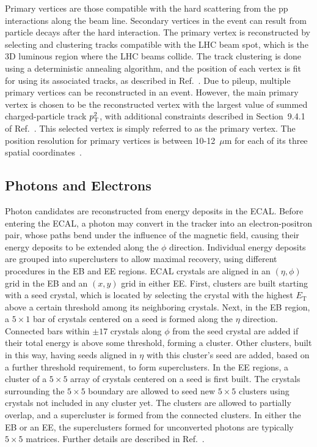 Primary vertices are those compatible with the hard scattering from the pp interactions along the beam line. Secondary vertices in the event can result from particle decays after the hard interaction. The primary vertex is reconstructed by selecting and clustering tracks compatible with the LHC beam spot, which is the 3D luminous region where the LHC beams collide. The track clustering is done using a deterministic annealing algorithm, and the position of each vertex is fit for using its associated tracks, as described in Ref.~\cite{Chatrchyan:2014fea}. Due to pileup, multiple primary vertices can be reconstructed in an event. However, the main primary vertex is chosen to be the reconstructed vertex with the largest value of summed charged-particle track $p_{\mathrm{T}}^2$, with additional constraints described in Section~9.4.1 of Ref.~\cite{Contardo:2020886}. This selected vertex is simply referred to as the primary vertex. The position resolution for primary vertices is between 10-12~$\mu$m for each of its three spatial coordinates~\cite{Chatrchyan:2014fea}.


\subsection{Photons and Electrons}

Photon candidates are reconstructed from energy deposits in the ECAL. Before entering the ECAL, a photon may convert in the tracker into an electron-positron pair, whose paths bend under the influence of the magnetic field, causing their energy deposits to be extended along the $\phi$ direction. Individual energy deposits are grouped into superclusters to allow maximal recovery, using different procedures in the EB and EE regions. ECAL crystals are aligned in an $(\eta, \phi)$ grid in the EB and an $(x, y)$ grid in either EE. First, clusters are built starting with a seed crystal, which is located by selecting the crystal with the highest $E_{\mathrm{T}}$ above a certain threshold among its neighboring crystals. Next, in the EB region, a $5{\times}1$ bar of crystals centered on a seed is formed along the $\eta$ direction. Connected bars within $\pm17$ crystals along $\phi$ from the seed crystal are added if their total energy is above some threshold, forming a cluster. Other clusters, built in this way, having seeds aligned in $\eta$ with this cluster's seed are added, based on a further threshold requirement, to form superclusters. In the EE regions, a cluster of a $5{\times}5$ array of crystals centered on a seed is first built. The crystals surrounding the $5{\times}5$ boundary are allowed to seed new $5{\times}5$ clusters using crystals not included in any cluster yet. The clusters are allowed to partially overlap, and a supercluster is formed from the connected clusters. In either the EB or an EE, the superclusters formed for unconverted photons are typically $5{\times}5$ matrices. Further details are described in Ref.~\cite{CMS:EGM-14-001}.

